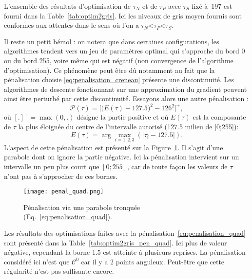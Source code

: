 \documentclass[main.tex]{subfiles}
\begin{document}

L'ensemble des résultats d'optimisation de $\tau_N$ et de $\tau_P$ avec $\tau_S$ fixé à~197 est fourni dans la Table~\ref{tab:optim2gris}. Ici les niveaux de gris moyen fournis sont conformes aux attentes dans le sens où l'on a $\tau_N$<$\tau_P$<$\tau_S$.

Il reste un petit bémol : on notera que dans certaines configurations, les algorithmes tendent vers un jeu de paramètres optimal qui s'approche du bord 0 ou du bord 255, voire même qui est négatif (\ie non convergence de l'algorithme d'optimisation). Ce phénomène peut être dû notamment au fait que la pénalisation choisie \eqref{eq:penalisation_creneau} présente une discontinuité. Les algorithmes de descente fonctionnant sur une approximation du gradient peuvent ainsi être perturbé par cette discontinuité. Essayons alors une autre pénalisation :
\begin{equation}
\label{eq:penalisation_quad}
\mathcal{P}(\tau) = \Big[ \big(  E(\tau) - 127.5 \big)^2-126^2 \Big]^+,
\end{equation}
où $[.]^+=\max(0,.)$ désigne la partie positive et où $E(\tau)$ est la composante de $\tau$ la plus éloignée du centre de l'intervalle autorisé (127.5 milieu de [0;255]):
\begin{equation}
\label{eq:tau_eloigne} E(\tau)= \arg\max_{i=1,2,3}( | \tau_i-127.5 | ).
\end{equation} 
L'aspect de cette pénalisation est présenté sur la Figure~\ref{fig:penal_quad}. Il s'agit d'une parabole dont on ignore la partie négative. 
Ici la pénalisation intervient sur un intervalle un peu plus court que $[0;255]$, car de toute façon les valeurs de $\tau$ n'ont pas à s'approcher de ces bornes.
\begin{figure}
\centering
\texttt{[image: penal\_quad.png]}
\vspace{-3mm}
\caption{\label{fig:penal_quad} Pénalisation via une parabole tronquée (\cf Eq.~\eqref{eq:penalisation_quad}). }
\end{figure}
Les résultats des optimisations faites avec la pénalisation~\eqref{eq:penalisation_quad} sont présenté dans la Table~\ref{tab:optim2gris_pen_quad}. Ici plus de valeur négative, cependant la borne 1.5 est atteinte à plusieurs reprises. La pénalisation considéré ici n'est que $\mathcal{C}^0$ car il y a 2 points anguleux. Peut-être que cette régularité n'est pas suffisante encore.
\end{document}
